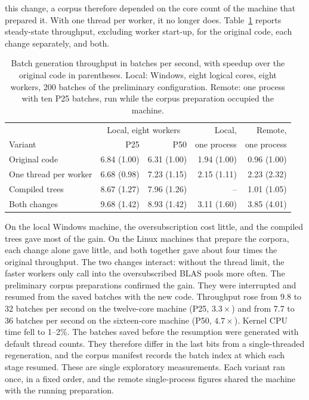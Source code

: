 this change, a corpus therefore depended on the core count of the machine that
prepared it. With one thread per worker, it no longer does.
Table~\ref{tab:generation-speedup} reports steady-state throughput, excluding
worker start-up, for the original code, each change separately, and both.
\begin{table}[htbp]\centering
\caption{Batch generation throughput in batches per second, with speedup over
the original code in parentheses. Local: Windows, eight logical cores, eight
workers, 200 batches of the preliminary configuration. Remote: one process
with ten P25 batches, run while the corpus preparation occupied the machine.}
\label{tab:generation-speedup}
\begin{tabular}{lrrrr}\hline
 & \multicolumn{2}{c}{Local, eight workers} & Local, & Remote, \\
Variant & P25 & P50 & one process & one process \\\hline
Original code & 6.84 (1.00) & 6.31 (1.00) & 1.94 (1.00) & 0.96 (1.00) \\
One thread per worker & 6.68 (0.98) & 7.23 (1.15) & 2.15 (1.11) & 2.23 (2.32) \\
Compiled trees & 8.67 (1.27) & 7.96 (1.26) & -- & 1.01 (1.05) \\
Both changes & 9.68 (1.42) & 8.93 (1.42) & 3.11 (1.60) & 3.85 (4.01) \\\hline
\end{tabular}\end{table}
On the local Windows machine, the oversubscription cost little, and the
compiled trees gave most of the gain. On the Linux machines that prepare the
corpora, each change alone gave little, and both together gave about four
times the original throughput. The two changes interact: without the thread
limit, the faster workers only call into the oversubscribed BLAS pools more
often. The preliminary corpus preparations confirmed the gain. They were
interrupted and resumed from the saved batches with the new code. Throughput
rose from 9.8 to 32 batches per second on the twelve-core machine (P25,
$3.3\times$) and from 7.7 to 36 batches per second on the sixteen-core machine
(P50, $4.7\times$). Kernel CPU time fell to 1--2\%. The batches saved before
the resumption were generated with default thread counts. They therefore
differ in the last bits from a single-threaded regeneration, and the corpus
manifest records the batch index at which each stage resumed.
These are single exploratory measurements. Each variant ran once, in a fixed
order, and the remote single-process figures shared the machine with the
running preparation.
